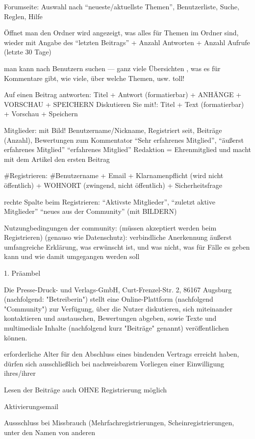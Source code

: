 Forumseite: Auswahl nach ``neueste/aktuellste Themen'', Benutzerliste, Suche, Reglen, Hilfe

Öffnet man den Ordner wird angezeigt, was alles für Themen im Ordner sind, wieder mit Angabe des ``letzten Beitrags'' + Anzahl Antworten + Anzahl Aufrufe (letzte 30 Tage)

man kann nach Benutzern suchen
--- ganz viele Übersichten , was es für Kommentare gibt, wie viele, über welche Themen, usw. toll!

Auf einen Beitrag antworten: Titel + Antwort (formatierbar) + ANHÄNGE + VORSCHAU + SPEICHERN
Diskutieren Sie mit!: Titel + Text (formatierbar) + Vorschau + Speichern

Mitglieder: mit Bild! Benutzername/Nickname, Registriert seit, Beiträge (Anzahl), Bewertungen zum Kommentator ``Sehr erfahrenes Mitglied'',  ``äußerst erfahrenes Mitglied'' ``erfahrenes Mitglied''
Redaktion = Ehrenmitglied und macht mit dem Artikel den ersten Beitrag

#Registrieren:
#Benutzername + Email + Klarnamenpflicht (wird nicht öffentlich) + WOHNORT (zwingend, nicht öffentlich) + Sicherheitsfrage

rechte Spalte beim Registrieren: ``Aktivste Mitglieder'', ``zuletzt aktive Mitglieder'' ``neues aus der Community'' (mit BILDERN)

Nutzungbedingungen der community: (müssen akzeptiert werden beim Registrieren) (genauso wie Datenschutz):
verbindliche Anerkennung
äußerst umfangreiche Erklärung, was erwünscht ist, und was nicht, was für Fälle es geben kann und wie damit umgegangen werden soll 

1. Präambel

Die Presse-Druck- und Verlags-GmbH, Curt-Frenzel-Str. 2, 86167 Augsburg (nachfolgend: "Betreiberin") stellt eine Online-Plattform (nachfolgend "Community") zur Verfügung, über die Nutzer diskutieren, sich miteinander kontaktieren und austauschen, Bewertungen abgeben, sowie Texte und multimediale Inhalte (nachfolgend kurz "Beiträge" genannt) veröffentlichen können.

erforderliche Alter für den Abschluss eines bindenden Vertrags erreicht haben, dürfen sich ausschließlich bei nachweisbarem Vorliegen einer Einwilligung ihres/ihrer

Lesen der Beiträge auch OHNE Registrierung möglich

Aktivierungsemail

Aussschluss bei Missbrauch (Mehrfachregistrierungen, Scheinregistrierungen, unter den Namen von anderen

